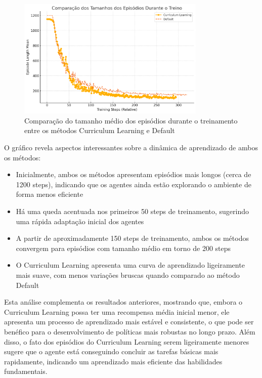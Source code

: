 \begin{figure}[H]
    \centering
    \includegraphics[width=0.8\textwidth]{fig/tamanho_eps.png}
    \caption{Comparação do tamanho médio dos episódios durante o treinamento entre os métodos Curriculum Learning e Default}
    \label{fig:tamanho_eps}
\end{figure}

O gráfico revela aspectos interessantes sobre a dinâmica de aprendizado de ambos os métodos:

\begin{itemize}
    \item Inicialmente, ambos os métodos apresentam episódios mais longos (cerca de 1200 steps), indicando que os agentes ainda estão explorando o ambiente de forma menos eficiente
    
    \item Há uma queda acentuada nos primeiros 50 steps de treinamento, sugerindo uma rápida adaptação inicial dos agentes
    
    \item A partir de aproximadamente 150 steps de treinamento, ambos os métodos convergem para episódios com tamanho médio em torno de 200 steps
    
    \item O Curriculum Learning apresenta uma curva de aprendizado ligeiramente mais suave, com menos variações bruscas quando comparado ao método Default
\end{itemize}

Esta análise complementa os resultados anteriores, mostrando que, embora o Curriculum Learning possa ter uma recompensa média inicial menor, ele apresenta um processo de aprendizado mais estável e consistente, o que pode ser benéfico para o desenvolvimento de políticas mais robustas no longo prazo. Além disso, o fato dos episódios do Curriculum Learning serem ligeiramente menores sugere que o agente está conseguindo concluir as tarefas básicas mais rapidamente, indicando um aprendizado mais eficiente das habilidades fundamentais.